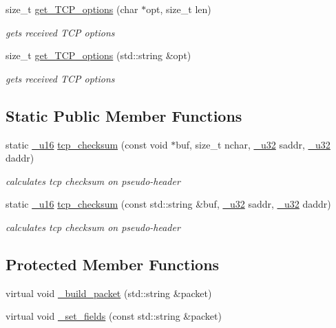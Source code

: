 \begin{CompactItemize}
size\_\-t \hyperlink{classsocketpp_1_1TCP__RawSocket_75e954caea8187c5077821cd449199e7}{get\_\-TCP\_\-options} (char $\ast$opt, size\_\-t len)
\begin{CompactList}\small\item\em gets received TCP options \item\end{CompactList}\item 
size\_\-t \hyperlink{classsocketpp_1_1TCP__RawSocket_67ab79f764a710067590427cb35aeea0}{get\_\-TCP\_\-options} (std::string \&opt)
\begin{CompactList}\small\item\em gets received TCP options \item\end{CompactList}\end{CompactItemize}
\subsection*{Static Public Member Functions}
\begin{CompactItemize}
\item 
static \hyperlink{namespacesocketpp_0d48e817f00cbb84d07faec41ee4b169}{\_\-u16} \hyperlink{classsocketpp_1_1TCP__RawSocket_d0b16fff831e7e756a127cc47de4b9aa}{tcp\_\-checksum} (const void $\ast$buf, size\_\-t nchar, \hyperlink{namespacesocketpp_d9c3b2ad093bb5814af59760e0a2192a}{\_\-u32} saddr, \hyperlink{namespacesocketpp_d9c3b2ad093bb5814af59760e0a2192a}{\_\-u32} daddr)
\begin{CompactList}\small\item\em calculates tcp checksum on pseudo-header \item\end{CompactList}\item 
static \hyperlink{namespacesocketpp_0d48e817f00cbb84d07faec41ee4b169}{\_\-u16} \hyperlink{classsocketpp_1_1TCP__RawSocket_59a27cc258c1007b2f7e68428fd50f80}{tcp\_\-checksum} (const std::string \&buf, \hyperlink{namespacesocketpp_d9c3b2ad093bb5814af59760e0a2192a}{\_\-u32} saddr, \hyperlink{namespacesocketpp_d9c3b2ad093bb5814af59760e0a2192a}{\_\-u32} daddr)
\begin{CompactList}\small\item\em calculates tcp checksum on pseudo-header \item\end{CompactList}\end{CompactItemize}
\subsection*{Protected Member Functions}
\begin{CompactItemize}
\item 
virtual void \hyperlink{classsocketpp_1_1TCP__RawSocket_d89a39d4bc91a76d0cb50da5cdd10fbc}{\_\-build\_\-packet} (std::string \&packet)
\item 
virtual void \hyperlink{classsocketpp_1_1TCP__RawSocket_6976a4726503eef03a8d446afdbaddbe}{\_\-set\_\-fields} (const std::string \&packet)
\end{CompactItemize}
